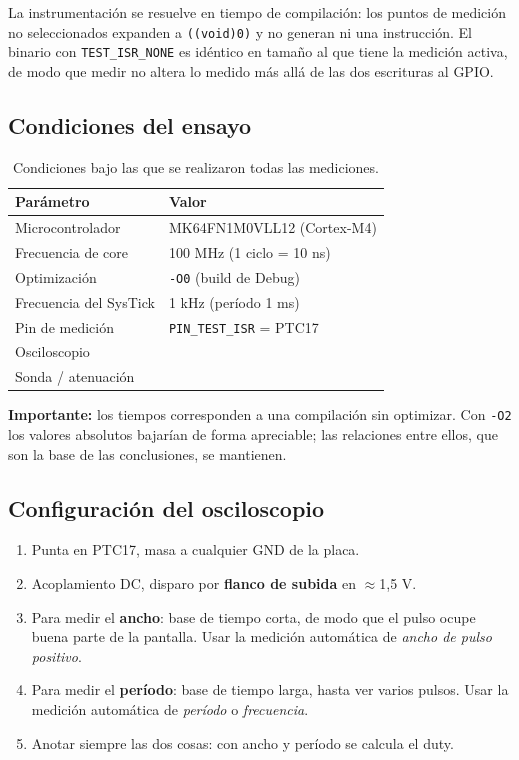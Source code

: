 \documentclass[11pt,a4paper]{article}
\newcommand{\dato}[1][2cm]{\underline{\hspace{#1}}}
\begin{document}
La instrumentación se resuelve en tiempo de compilación: los puntos de
medición no seleccionados expanden a \texttt{((void)0)} y no generan ni una
instrucción. El binario con \texttt{TEST\_ISR\_NONE} es idéntico en tamaño al
que tiene la medición activa, de modo que medir no altera lo medido más allá
de las dos escrituras al GPIO.

\subsection{Condiciones del ensayo}

\begin{table}[H]
\centering
\begin{tabular}{@{}ll@{}}
\toprule
\textbf{Parámetro} & \textbf{Valor} \\
\midrule
Microcontrolador        & MK64FN1M0VLL12 (Cortex-M4) \\
Frecuencia de core      & 100 MHz (1 ciclo = 10 ns) \\
Optimización            & \texttt{-O0} (build de Debug) \\
Frecuencia del SysTick  & 1 kHz (período 1 ms) \\
Pin de medición         & \texttt{PIN\_TEST\_ISR} = PTC17 \\
Osciloscopio            & \dato[4cm] \\
Sonda / atenuación      & \dato[4cm] \\
\bottomrule
\end{tabular}
\caption{Condiciones bajo las que se realizaron todas las mediciones.}
\end{table}

\textbf{Importante:} los tiempos corresponden a una compilación sin optimizar.
Con \texttt{-O2} los valores absolutos bajarían de forma apreciable; las
relaciones entre ellos, que son la base de las conclusiones, se mantienen.

\subsection{Configuración del osciloscopio}

\begin{enumerate}
  \item Punta en PTC17, masa a cualquier GND de la placa.
  \item Acoplamiento DC, disparo por \textbf{flanco de subida} en $\approx$1,5 V.
  \item Para medir el \textbf{ancho}: base de tiempo corta, de modo que el
        pulso ocupe buena parte de la pantalla. Usar la medición automática
        de \textit{ancho de pulso positivo}.
  \item Para medir el \textbf{período}: base de tiempo larga, hasta ver varios
        pulsos. Usar la medición automática de \textit{período} o
        \textit{frecuencia}.
  \item Anotar siempre las dos cosas: con ancho y período se calcula el duty.
\end{enumerate}
\end{document}
